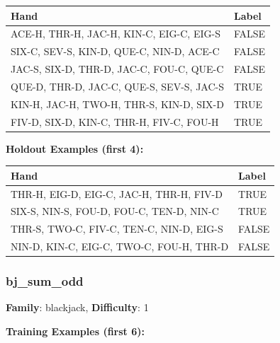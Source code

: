 \documentclass[10pt,a4paper]{article}
\begin{document}
\begin{small}
\begin{tabular}{p{8cm}l}
\toprule
Hand & Label \\
\midrule
ACE-H, THR-H, JAC-H, KIN-C, EIG-C, EIG-S & \textcolor{negative}{FALSE} \\
SIX-C, SEV-S, KIN-D, QUE-C, NIN-D, ACE-C & \textcolor{negative}{FALSE} \\
JAC-S, SIX-D, THR-D, JAC-C, FOU-C, QUE-C & \textcolor{negative}{FALSE} \\
QUE-D, THR-D, JAC-C, QUE-S, SEV-S, JAC-S & \textcolor{positive}{TRUE} \\
KIN-H, JAC-H, TWO-H, THR-S, KIN-D, SIX-D & \textcolor{positive}{TRUE} \\
FIV-D, SIX-D, KIN-C, THR-H, FIV-C, FOU-H & \textcolor{positive}{TRUE} \\
\bottomrule
\end{tabular}
\end{small}

\textbf{Holdout Examples (first 4):}

\begin{small}
\begin{tabular}{p{8cm}l}
\toprule
Hand & Label \\
\midrule
THR-H, EIG-D, EIG-C, JAC-H, THR-H, FIV-D & \textcolor{positive}{TRUE} \\
SIX-S, NIN-S, FOU-D, FOU-C, TEN-D, NIN-C & \textcolor{positive}{TRUE} \\
THR-S, TWO-C, FIV-C, TEN-C, NIN-D, EIG-S & \textcolor{negative}{FALSE} \\
NIN-D, KIN-C, EIG-C, TWO-C, FOU-H, THR-D & \textcolor{negative}{FALSE} \\
\bottomrule
\end{tabular}
\end{small}

\vspace{0.5cm}

\subsubsection{bj\_sum\_odd}

\textbf{Family}: blackjack, \textbf{Difficulty}: 1

\textbf{Training Examples (first 6):}
\end{document}

